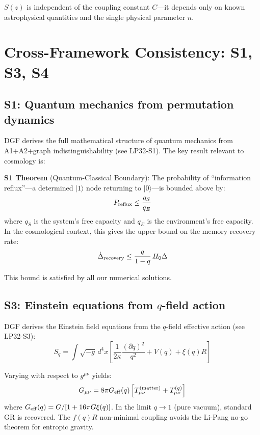 \documentclass[12pt,a4paper]{article}
\begin{document}
$S(z)$ is independent of the coupling constant $C$---it depends only on known astrophysical quantities and the single physical parameter $n$.

\section{Cross-Framework Consistency: S1, S3, S4}

\subsection{S1: Quantum mechanics from permutation dynamics}

DGF derives the full mathematical structure of quantum mechanics from A1+A2+graph indistinguishability (see LP32-S1). The key result relevant to cosmology is:

{\bf S1 Theorem} (Quantum-Classical Boundary): The probability of ``information reflux''---a determined $|1\rangle$ node returning to $|0\rangle$---is bounded above by:
\begin{equation}
P_{\rm reflux} \leq \frac{q_S}{q_E}
\end{equation}
where $q_S$ is the system's free capacity and $q_E$ is the environment's free capacity. In the cosmological context, this gives the upper bound on the memory recovery rate:
\begin{equation}
\dot{\Delta}_{\rm recovery} \leq \frac{q}{1-q}\,H_0\Delta
\end{equation}

This bound is satisfied by all our numerical solutions.

\subsection{S3: Einstein equations from $q$-field action}

DGF derives the Einstein field equations from the $q$-field effective action (see LP32-S3):
\begin{equation}
S_q = \int\sqrt{-g}\,d^4x\left[\frac{1}{2\kappa}\frac{(\partial q)^2}{q^2} + V(q) + \xi(q)R\right]
\end{equation}

Varying with respect to $g^{\mu\nu}$ yields:
\begin{equation}
G_{\mu\nu} = 8\pi G_{\rm eff}(q)\left[T_{\mu\nu}^{\rm(matter)} + T_{\mu\nu}^{(q)}\right]
\end{equation}
where $G_{\rm eff}(q)=G/[1+16\pi G\xi(q)]$. In the limit $q\to1$ (pure vacuum), standard GR is recovered. The $f(q)R$ non-minimal coupling avoids the Li-Pang no-go theorem for entropic gravity.
\end{document}
